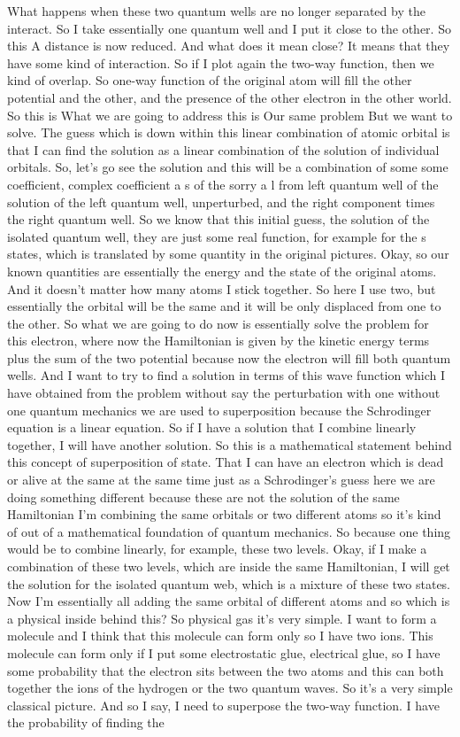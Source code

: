 What happens when these two quantum wells are no longer separated by the interact. So I take essentially one quantum well and I put it close to the other. So this A distance is now reduced. And what does it mean close? It means that they have some kind of interaction. So if I plot again the two-way function, then we kind of overlap. So one-way function of the original atom will fill the other potential and the other, and the presence of the other electron in the other world. So this is What we are going to address this is Our same problem But we want to solve. The guess which is down within this linear combination of atomic orbital is that I can find the solution as a linear combination of the solution of individual orbitals. So, let's go see the solution and this will be a combination of some some coefficient, complex coefficient a s of the sorry a l from left quantum well of the solution of the left quantum well, unperturbed, and the right component times the right quantum well. So we know that this initial guess, the solution of the isolated quantum well, they are just some real function, for example for the s states, which is translated by some quantity in the original pictures. Okay, so our known quantities are essentially the energy and the state of the original atoms. And it doesn't matter how many atoms I stick together. So here I use two, but essentially the orbital will be the same and it will be only displaced from one to the other. So what we are going to do now is essentially solve the problem for this electron, where now the Hamiltonian is given by the kinetic energy terms plus the sum of the two potential because now the electron will fill both quantum wells. And I want to try to find a solution in terms of this wave function which I have obtained from the problem without say the perturbation with one without one quantum mechanics we are used to superposition because the Schrodinger equation is a linear equation. So if I have a solution that I combine linearly together, I will have another solution. So this is a mathematical statement behind this concept of superposition of state. That I can have an electron which is dead or alive at the same at the same time just as a Schrodinger's guess here we are doing something different because these are not the solution of the same Hamiltonian I'm combining the same orbitals or two different atoms so it's kind of out of a mathematical foundation of quantum mechanics. So because one thing would be to combine linearly, for example, these two levels. Okay, if I make a combination of these two levels, which are inside the same Hamiltonian, I will get the solution for the isolated quantum web, which is a mixture of these two states. Now I'm essentially all adding the same orbital of different atoms and so which is a physical inside behind this? So physical gas it's very simple. I want to form a molecule and I think that this molecule can form only so I have two ions. This molecule can form only if I put some electrostatic glue, electrical glue, so I have some probability that the electron sits between the two atoms and this can both together the ions of the hydrogen or the two quantum waves. So it's a very simple classical picture. And so I say, I need to superpose the two-way function. I have the probability of finding the 